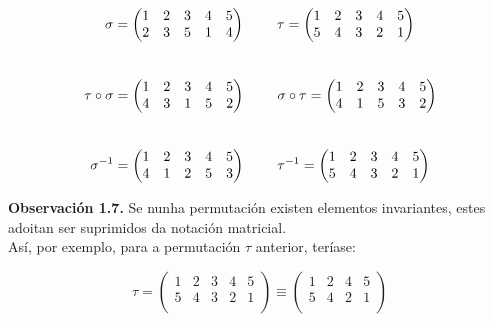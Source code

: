 \documentclass[twoside]{report}
\theoremstyle{mystyle}
\begin{document}
$$\sigma = \begin{pmatrix}
1 & 2 & 3 & 4 & 5 \\
2 & 3 & 5 & 1 & 4 \\
\end{pmatrix}
\hspace{8mm}
\tau = \begin{pmatrix}
1 & 2 & 3 & 4 & 5 \\
5 & 4 & 3 & 2 & 1 \\
\end{pmatrix} 
$$
\\
$$
\tau \circ \sigma = \begin{pmatrix}
1 & 2 & 3 & 4 & 5 \\
4 & 3 & 1 & 5 & 2 \\
\end{pmatrix}
\hspace{8mm}
\sigma \circ \tau = \begin{pmatrix}
1 & 2 & 3 & 4 & 5 \\
4 & 1 & 5 & 3 & 2 \\
\end{pmatrix}
$$
\\
$$
\sigma^{-1} = \begin{pmatrix}
1 & 2 & 3 & 4 & 5 \\
4 & 1 & 2 & 5 & 3 \\
\end{pmatrix}
\hspace{8mm}
\tau^{-1} = \begin{pmatrix}
1 & 2 & 3 & 4 & 5 \\
5 & 4 & 3 & 2 & 1 \\
\end{pmatrix}
$$

\vspace{3mm}

\noindent \textbf{Observación 1.7.} Se nunha permutación existen elementos invariantes, estes adoitan ser suprimidos da notación matricial. \\

\noindent Así, por exemplo, para a permutación $\tau$ anterior, teríase:

$$
\tau = \begin{pmatrix}
1 & 2 & 3 & 4 & 5 \\
5 & 4 & 3 & 2 & 1 \\
\end{pmatrix}
\equiv
\begin{pmatrix}
1 & 2 & 4 & 5 \\
5 & 4 & 2 & 1 \\
\end{pmatrix}
$$
\end{document}
